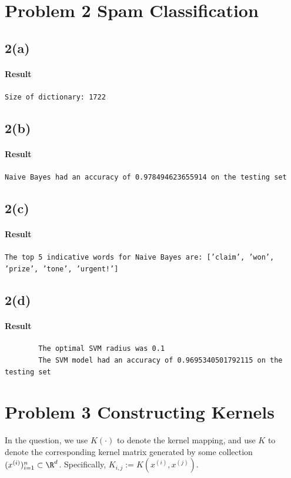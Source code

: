 \documentclass[11pt]{article}
\newcommand{\upi}[0]{^{(i)}}
\begin{document}
	\newpage
	\section{Problem 2 Spam Classification}
	\subsection{2(a)}
	\paragraph{Result} \texttt{Size of dictionary: 1722}
	
	\newpage
	\subsection{2(b)}
	\paragraph{Result} \texttt{Naive Bayes had an accuracy of 0.978494623655914 on the testing set}
	
	\newpage
	\subsection{2(c)}
	\paragraph{Result} \texttt{The top 5 indicative words for Naive Bayes are:  ['claim', 'won', 'prize', 'tone', 'urgent!']}
	
	\newpage
	\subsection{2(d)}
	\paragraph{Result}
	\begin{verbatim}
		The optimal SVM radius was 0.1
		The SVM model had an accuracy of 0.9695340501792115 on the testing set
	\end{verbatim}
	
	\newpage
	\section{Problem 3 Constructing Kernels}
	\begin{notation}
		In the question, we use $K(\cdot)$ to denote the kernel mapping, and use $K$ to denote the corresponding kernel matrix generated by some collection $(x\upi)_{i=1}^n \subset \R^d$. Specifically, $K_{i, j} := K(x\upi, x^{(j)})$.
	\end{notation}
\end{document}

